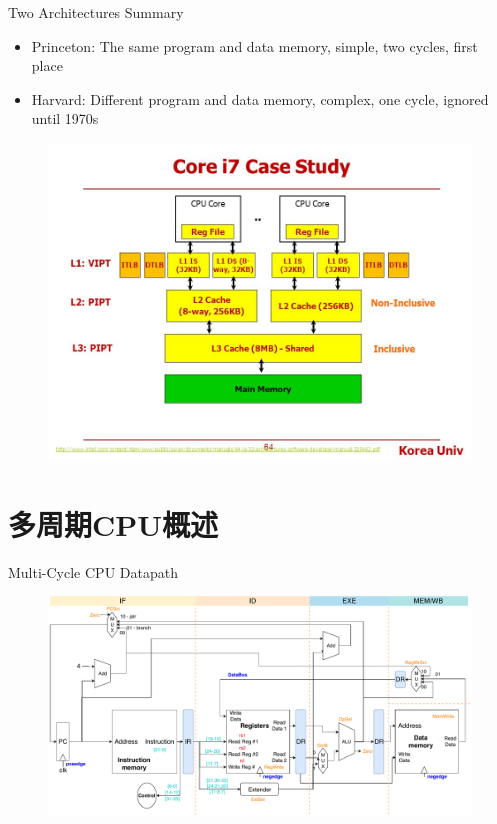 \documentclass{myslide}
\begin{document}
\begin{frame}{Two Architectures Summary}
\begin{itemize}
	\item Princeton: The same program and data memory, simple, two cycles, first place
	\item Harvard: Different program and data memory, complex, one cycle, ignored until 1970s
\end{itemize}
\begin{figure}
\centering
\includegraphics[width=0.6\linewidth]{fig/Lecture2/Core-i7-cache.jpg}
\end{figure}
\end{frame}

\section{多周期CPU概述}
\begin{frame}
\sectionpage
\end{frame}

\begin{frame}{Multi-Cycle CPU Datapath}
\begin{figure}
\centering
\includegraphics[width=\linewidth]{fig/Lecture2/Datapath-Multi.pdf}
\end{figure}
\end{frame}
\end{document}
